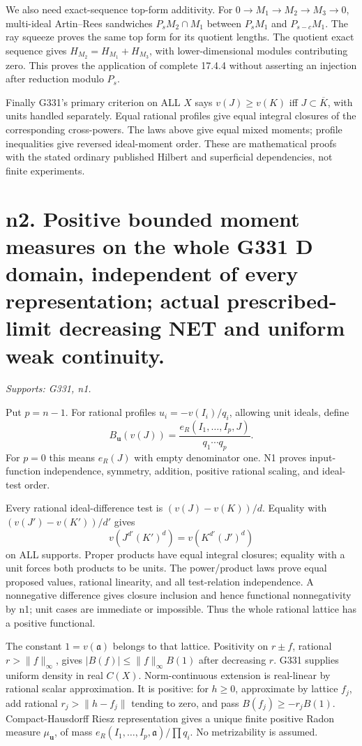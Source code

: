 \documentclass[11pt]{article}
\begin{document}
We also need exact-sequence top-form additivity. For \(0\to M_1\to M_2\to M_3\to0\), multi-ideal Artin--Rees sandwiches \(P_sM_2\cap M_1\) between \(P_sM_1\) and \(P_{s-c}M_1\). The ray squeeze proves the same top form for its quotient lengths. The quotient exact sequence gives \(H_{M_2}=H_{M_1}+H_{M_3}\), with lower-dimensional modules contributing zero. This proves the application of complete 17.4.4 without asserting an injection after reduction modulo \(P_s\).

Finally G331's primary criterion on ALL \(X\) says \(v(J)\ge v(K)\) iff \(J\subset\overline K\), with units handled separately. Equal rational profiles give equal integral closures of the corresponding cross-powers. The laws above give equal mixed moments; profile inequalities give reversed ideal-moment order. These are mathematical proofs with the stated ordinary published Hilbert and superficial dependencies, not finite experiments.

\section{n2. Positive bounded moment measures on the whole G331 D domain, independent of every representation; actual prescribed-limit decreasing NET and uniform weak continuity.}
\textit{Supports: G331, n1.}

Put \(p=n-1\). For rational profiles \(u_i=-v(I_i)/q_i\), allowing unit ideals, define
\[
B_{\boldsymbol u}(v(J))=\frac{e_R(I_1,\ldots,I_p,J)}{q_1\cdots q_p}.
\]
For \(p=0\) this means \(e_R(J)\) with empty denominator one. N1 proves input-function independence, symmetry, addition, positive rational scaling, and ideal-test order.

Every rational ideal-difference test is \((v(J)-v(K))/d\). Equality with \((v(J')-v(K'))/d'\) gives
\[
v(J^{d'}(K')^d)=v(K^{d'}(J')^d)
\]
on ALL supports. Proper products have equal integral closures; equality with a unit forces both products to be units. The power/product laws prove equal proposed values, rational linearity, and all test-relation independence. A nonnegative difference gives closure inclusion and hence functional nonnegativity by n1; unit cases are immediate or impossible. Thus the whole rational lattice has a positive functional.

The constant \(1=v(\mathfrak a)\) belongs to that lattice. Positivity on \(r\pm f\), rational \(r>\|f\|_\infty\), gives \(|B(f)|\le\|f\|_\infty B(1)\) after decreasing \(r\). G331 supplies uniform density in real \(C(X)\). Norm-continuous extension is real-linear by rational scalar approximation. It is positive: for \(h\ge0\), approximate by lattice \(f_j\), add rational \(r_j>\|h-f_j\|\) tending to zero, and pass \(B(f_j)\ge-r_jB(1)\). Compact-Hausdorff Riesz representation gives a unique finite positive Radon measure \(\mu_{\boldsymbol u}\), of mass \(e_R(I_1,\ldots,I_p,\mathfrak a)/\prod q_i\). No metrizability is assumed.
\end{document}
